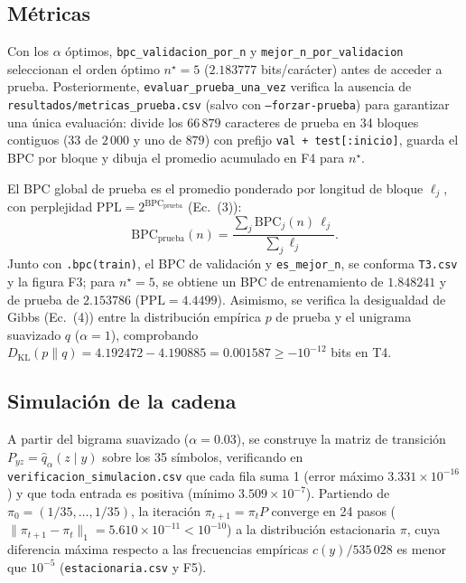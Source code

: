 \documentclass[11pt,letterpaper]{article}
\begin{document}
	\subsection{Métricas}
	Con los $\alpha$ óptimos, \texttt{bpc\_validacion\_por\_n} y \texttt{mejor\_n\_por\_validacion} seleccionan el orden óptimo $n^\star=5$ ($2.183777$ bits/carácter) antes de acceder a prueba. Posteriormente, \texttt{evaluar\_prueba\_una\_vez} verifica la ausencia de \texttt{resultados/metricas\_prueba.csv} (salvo con \texttt{--forzar-prueba}) para garantizar una única evaluación: divide los $66\,879$ caracteres de prueba en 34 bloques contiguos (33 de $2\,000$ y uno de $879$) con prefijo \texttt{val + test[:inicio]}, guarda el BPC por bloque y dibuja el promedio acumulado en F4 para $n^\star$.
	
	El BPC global de prueba es el promedio ponderado por longitud de bloque $\ell_j$, con perplejidad $\mathrm{PPL}=2^{\mathrm{BPC}_{\mathrm{prueba}}}$ (Ec.~(3)):
	\begin{equation}
		\mathrm{BPC}_{\mathrm{prueba}}(n)
		=\frac{\sum_j \mathrm{BPC}_j(n)\,\ell_j}{\sum_j \ell_j}.
		\label{eq:bpc_test}
	\end{equation}
	Junto con \texttt{.bpc(train)}, el BPC de validación y \texttt{es\_mejor\_n}, se conforma \texttt{T3.csv} y la figura F3; para $n^\star=5$, se obtiene un BPC de entrenamiento de $1.848241$ y de prueba de $2.153786$ ($\mathrm{PPL}=4.4499$). Asimismo, se verifica la desigualdad de Gibbs (Ec.~(4)) entre la distribución empírica $p$ de prueba y el unigrama suavizado $q$ ($\alpha=1$), comprobando $D_{\mathrm{KL}}(p\|q)=4.192472-4.190885=0.001587\ge-10^{-12}$ bits en T4.
	
	\subsection{Simulación de la cadena}
	A partir del bigrama suavizado ($\alpha=0.03$), se construye la matriz de transición $P_{yz}=\hat q_\alpha(z\mid y)$ sobre los 35 símbolos, verificando en \texttt{verificacion\_simulacion.csv} que cada fila suma 1 (error máximo $3.331\times10^{-16}$) y que toda entrada es positiva (mínimo $3.509\times10^{-7}$). Partiendo de $\pi_0=(1/35,\dots,1/35)$, la iteración $\pi_{t+1}=\pi_t P$ converge en 24 pasos ($\|\pi_{t+1}-\pi_t\|_1=5.610\times10^{-11}<10^{-10}$) a la distribución estacionaria $\pi$, cuya diferencia máxima respecto a las frecuencias empíricas $c(y)/535\,028$ es menor que $10^{-5}$ (\texttt{estacionaria.csv} y F5).
	
\end{document}
